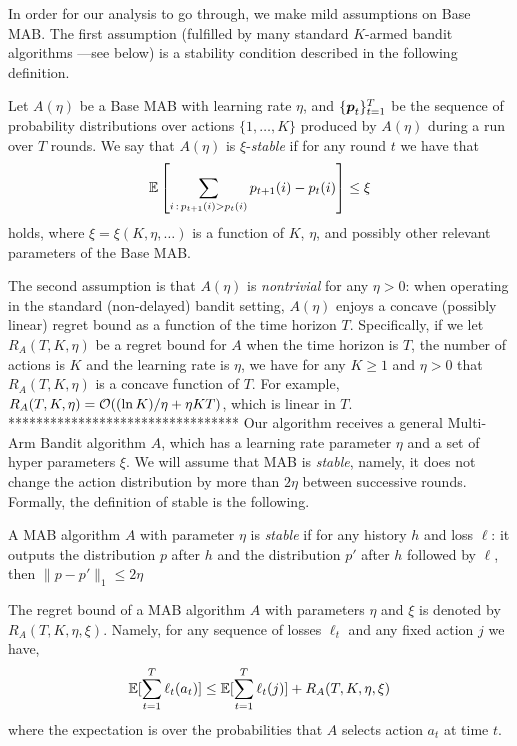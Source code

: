 %
In order for our analysis to go through, we make mild assumptions on Base MAB. The first assumption (fulfilled by many
standard $K$-armed bandit algorithms ---see below) is a stability condition described in the following definition.
%
\begin{definition}\label{d:stabilityexp3}
Let $A(\eta)$ be a Base MAB with learning rate $\eta$,
and $\{\boldsymbol{p}_t\}_{t=1}^T$ be the sequence of probability distributions over actions $\{1,\ldots,K\}$ produced by $A(\eta)$ during a run over $T$ rounds. We say that $A(\eta)$ is $\xi$-{\em stable} if for any round $t$ we have that
\[
    \mathbb{E}\left[\sum_{i\,:\,p_{t+1}(i) > p_t(i)} p_{t+1}(i) - p_t(i)\right] \leq \xi
\]
holds, where $\xi = \xi(K,\eta,\ldots)$ is a function of $K$, $\eta$, and possibly other relevant parameters of the Base MAB.
\end{definition}
%
The second assumption is that $A(\eta)$ is {\em nontrivial} for any $\eta > 0$:
when operating in the standard (non-delayed) bandit setting, $A(\eta)$ enjoys a concave (possibly linear) regret bound as a function of the time
horizon $T$.  Specifically, if we let $R_A(T,K,\eta)$ be a regret bound for $A$ when the time horizon is $T$, the number
of actions is $K$ and the learning rate is $\eta$, we have for any $K \geq 1$ and $\eta > 0$ that
$R_A(T,K,\eta)$ is a concave function of $T$. For example,
$R_A(T,K,\eta) = \mathcal{O}((\ln K)/\eta + \eta K T)$, which is linear in
$T$.
%
\iffalse
*********************************
Our algorithm receives a general Multi-Arm Bandit algorithm $A$,
which has a learning rate parameter $\eta$ and a set of hyper
parameters $\xi$. We will assume that MAB is {\em stable}, namely,
it does not change the action distribution by more than $2\eta$
between successive rounds. Formally, the definition of stable is the
following.
%
\begin{definition}
A MAB algorithm $A$ with parameter $\eta$ is {\em stable} if for any
history $h$ and loss $\ell$: it outputs the distribution $p$ after
$h$ and the distribution $p'$ after $h$ followed by $\ell$, then
$\|p-p'\|_1\leq 2\eta$
\end{definition}
%
The regret bound of a MAB algorithm $A$ with parameters $\eta$ and
$\xi$ is denoted by $R_A(T,K,\eta,\xi)$. Namely, for any sequence of
losses $\ell_t$ and any fixed action $j$ we have,
\[
\mathbb{E}[\sum_{t=1}^T \ell_t(a_t)]\leq \mathbb{E}[\sum_{t=1}^T \ell_t(j)] + R_A(T,K,\eta,\xi)
\]
where the expectation is over the probabilities that $A$ selects
action $a_t$ at time $t$.

